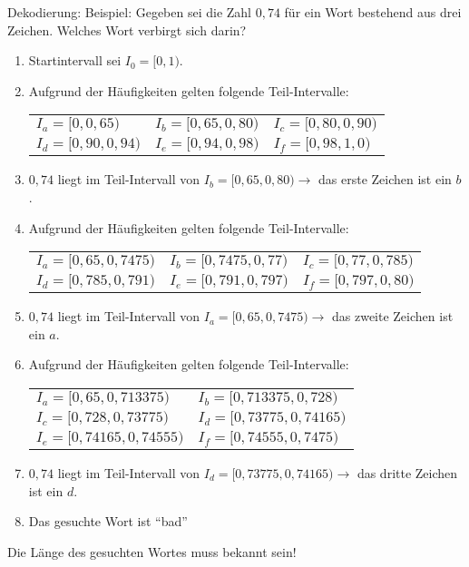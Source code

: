 Dekodierung:
Beispiel: Gegeben sei die Zahl $0{,}74$ für ein Wort bestehend aus drei Zeichen. Welches Wort verbirgt sich darin?
\begin{enumerate}
	\item Startintervall sei $I_0 = [0, 1)$.
	\item Aufgrund der Häufigkeiten gelten folgende Teil-Intervalle:\\
		\begin{tabular}{lll}
			$I_a = [0, 0{,}65)$  & $I_b = [0{,}65, 0{,}80)$  & $I_c = [0{,}80, 0{,}90)$ \\
			$I_d = [0{,}90, 0{,}94)$ & $I_e = [0{,}94, 0{,}98)$ & $I_f = [0{,}98, 1{,}0)$ \\			
		\end{tabular}
	\item $0{,}74$ liegt im Teil-Intervall von $I_b = [0{,}65, 0{,}80) \rightarrow$ das erste Zeichen ist ein $b$.
	\item Aufgrund der Häufigkeiten gelten folgende Teil-Intervalle:\\
		\begin{tabular}{lll}
			$I_a = [0{,}65, 0{,}7475)$ & $I_b = [0{,}7475, 0{,}77)$ & $I_c = [0{,}77, 0{,}785)$ \\
			$I_d = [0{,}785, 0{,}791)$ & $I_e = [0{,}791, 0{,}797)$ & $I_f = [0{,}797, 0{,}80)$ \\			
		\end{tabular}
	\item $0{,}74$ liegt im Teil-Intervall von $I_a = [0{,}65, 0{,}7475) \rightarrow$ das zweite Zeichen ist ein $a$.
	\item Aufgrund der Häufigkeiten gelten folgende Teil-Intervalle:\\
		\begin{tabular}{ll}
			$I_a = [0{,}65, 0{,}713375)$ & $I_b = [0{,}713375, 0{,}728)$\\
			$I_c = [0{,}728, 0{,}73775)$ & $I_d = [0{,}73775, 0{,}74165)$ \\
			$I_e = [0{,}74165, 0{,}74555)$ & $I_f = [0{,}74555, 0{,}7475)$ \\			
		\end{tabular}
	\item $0{,}74$ liegt im Teil-Intervall von $I_d = [0{,}73775, 0{,}74165) \rightarrow$ das dritte Zeichen ist ein $d$.
	\item Das gesuchte Wort ist \enquote{bad}
\end{enumerate}
Die Länge des gesuchten Wortes muss bekannt sein!
